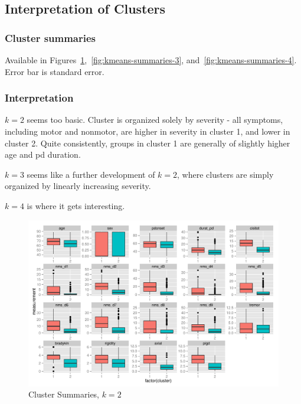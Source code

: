\documentclass[letterpaper,12pt]{article}
\begin{document}
\subsection{Interpretation of Clusters}

\subsubsection{Cluster summaries}

Available in
Figures~\ref{fig:kmeans-summaries-2},~\ref{fig:kmeans-summaries-3},
and~\ref{fig:kmeans-summaries-4}. Error bar is standard error.

\subsubsection{Interpretation}

$k = 2$ seems too basic. Cluster is organized solely by severity - all
symptoms, including motor and nonmotor, are higher in severity in cluster 1,
and lower in cluster 2. Quite consistently, groups in cluster 1 are generally
of slightly higher age and pd duration.

$k = 3$ seems like a further development of $k = 2$, where clusters are simply
organized by linearly increasing severity.

$k = 4$ is where it gets interesting.

\begin{figure}[ht]
  \centering
  \includegraphics[width=\linewidth]{kmeans-summaries-2.pdf}
  \caption{Cluster Summaries, $k = 2$}
  \label{fig:kmeans-summaries-2}
\end{figure}
\end{document}
